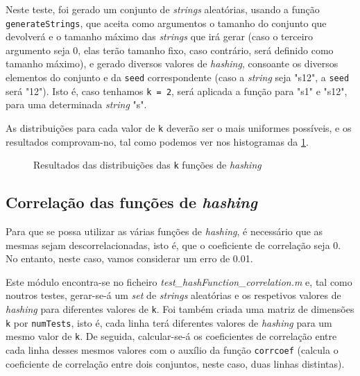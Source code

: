 \documentclass[a4paper,11pt,openright,oneside]{report}
\begin{document}
Neste teste, foi gerado um conjunto de \textit{strings} aleatórias, usando a função \texttt{generateStrings}, que aceita como argumentos o tamanho do conjunto que devolverá e o tamanho máximo das \textit{strings} que irá gerar (caso o terceiro argumento seja 0, elas terão tamanho fixo, caso contrário, será definido como tamanho máximo), e gerado diversos valores de \textit{hashing}, consoante os diversos elementos do conjunto e da \texttt{seed} correspondente (caso a \textit{string} seja "s12", a \texttt{seed} será "12"). Isto é, caso tenhamos \texttt{k = 2}, será aplicada a função para "s1" e "s12", para uma determinada \textit{string} "s".

As distribuições para cada valor de \texttt{k} deverão ser o mais uniformes possíveis, e os resultados comprovam-no, tal como podemos ver nos histogramas da \ref{fig:hashdist}.

\begin{figure}[ht]	
\center
{}
\caption{Resultados das distribuições das \texttt{k} funções de \textit{hashing}}
\label{fig:hashdist}
\end{figure}

\subsection{Correlação das funções de \textit{hashing}}
\label{subsec.hashcorr}

Para que se possa utilizar as várias funções de \textit{hashing}, é necessário que as mesmas sejam descorrelacionadas, isto é, que o coeficiente de correlação seja 0. No entanto, neste caso, vamos considerar um erro de 0.01.

Este módulo encontra-se no ficheiro \textit{test_hashFunction_correlation.m} e, tal como noutros testes, gerar-se-á um \textit{set} de \textit{strings} aleatórias e os respetivos valores de \textit{hashing} para diferentes valores de \texttt{k}. Foi também criada uma matriz de dimensões \texttt{k} por \texttt{numTests}, isto é, cada linha terá diferentes valores de \textit{hashing} para um mesmo valor de \texttt{k}. De seguida, calcular-se-á os coeficientes de correlação entre cada linha desses mesmos valores com o auxílio da função \texttt{corrcoef} (calcula o coeficiente de correlação entre dois conjuntos, neste caso, duas linhas distintas).
\end{document}
